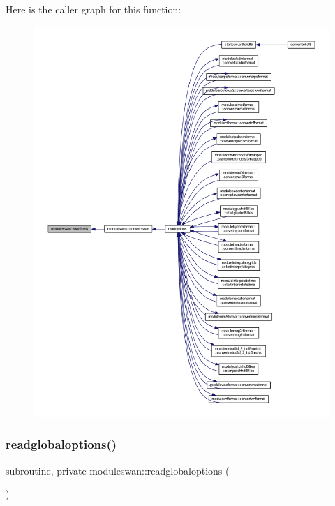 Here is the caller graph for this function\+:\nopagebreak
\begin{figure}[H]
\begin{center}
\leavevmode
\includegraphics[width=350pt]{namespacemoduleswan_a247f3ff2e64affcc137e817aadef34dc_icgraph}
\end{center}
\end{figure}
\mbox{\label{namespacemoduleswan_a98f6d123b6575342a8d84ba663e5a265}} 
\subsubsection{\texorpdfstring{readglobaloptions()}{readglobaloptions()}}
{\footnotesize\ttfamily subroutine, private moduleswan\+::readglobaloptions (\begin{DoxyParamCaption}{ }\end{DoxyParamCaption})\hspace{0.3cm}{\ttfamily [private]}}

